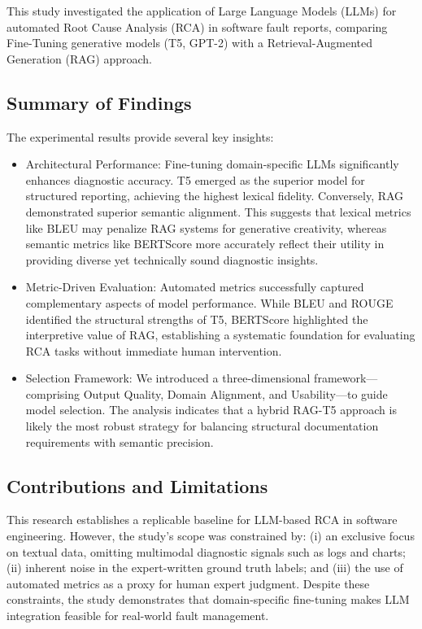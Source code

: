 \documentclass[10pt,twocolumn,journal]{IEEEtran}
\begin{document}
This study investigated the application of Large Language Models (LLMs) for automated Root Cause Analysis (RCA) in software fault reports, comparing Fine-Tuning generative models (T5, GPT-2) with a Retrieval-Augmented Generation (RAG) approach.

\subsection{Summary of Findings}
The experimental results provide several key insights:
\begin{itemize}
    \item Architectural Performance: Fine-tuning domain-specific LLMs significantly enhances diagnostic accuracy. T5 emerged as the superior model for structured reporting, achieving the highest lexical fidelity. Conversely, RAG demonstrated superior semantic alignment. This suggests that lexical metrics like BLEU may penalize RAG systems for generative creativity, whereas semantic metrics like BERTScore more accurately reflect their utility in providing diverse yet technically sound diagnostic insights.
    \item Metric-Driven Evaluation: Automated metrics successfully captured complementary aspects of model performance. While BLEU and ROUGE identified the structural strengths of T5, BERTScore highlighted the interpretive value of RAG, establishing a systematic foundation for evaluating RCA tasks without immediate human intervention.
    \item Selection Framework: We introduced a three-dimensional framework—comprising Output Quality, Domain Alignment, and Usability—to guide model selection. The analysis indicates that a hybrid RAG-T5 approach is likely the most robust strategy for balancing structural documentation requirements with semantic precision.
\end{itemize}



\subsection{Contributions and Limitations}
This research establishes a replicable baseline for LLM-based RCA in software engineering. However, the study's scope was constrained by: (i) an exclusive focus on textual data, omitting multimodal diagnostic signals such as logs and charts; (ii) inherent noise in the expert-written ground truth labels; and (iii) the use of automated metrics as a proxy for human expert judgment. Despite these constraints, the study demonstrates that domain-specific fine-tuning makes LLM integration feasible for real-world fault management.
\end{document}
